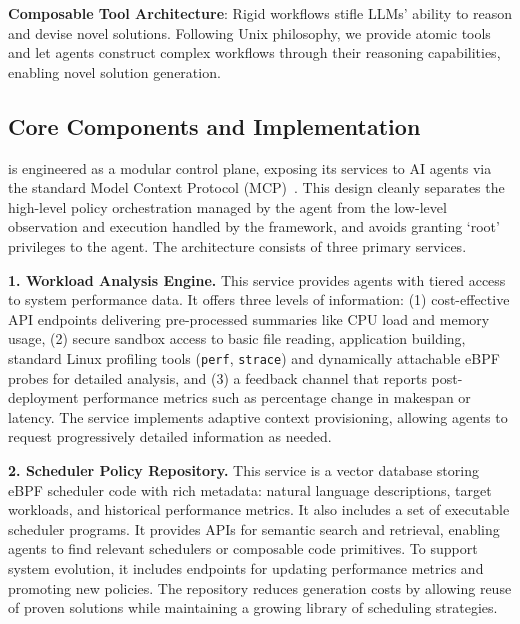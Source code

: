 \textbf{Composable Tool Architecture}: Rigid workflows stifle LLMs' ability to reason and devise novel solutions. Following Unix philosophy, we provide atomic tools and let agents construct complex workflows through their reasoning capabilities, enabling novel solution generation.

\subsection{Core Components and Implementation}
\sys is engineered as a modular control plane, exposing its services to AI agents via the standard Model Context Protocol (MCP)~\cite{anthropic2024mcp}. This design cleanly separates the high-level policy orchestration managed by the agent from the low-level observation and execution handled by the framework, and avoids granting `root' privileges to the agent. The architecture consists of three primary services.

\textbf{1. Workload Analysis Engine.} This service provides agents with tiered access to system performance data. It offers three levels of information: (1) cost-effective API endpoints delivering pre-processed summaries like CPU load and memory usage, (2) secure sandbox access to basic file reading, application building, standard Linux profiling tools (\texttt{perf}, \texttt{strace}) and dynamically attachable eBPF probes for detailed analysis, and (3) a feedback channel that reports post-deployment performance metrics such as percentage change in makespan or latency. The service implements adaptive context provisioning, allowing agents to request progressively detailed information as needed.

\textbf{2. Scheduler Policy Repository.} This service is a vector database storing eBPF scheduler code with rich metadata: natural language descriptions, target workloads, and historical performance metrics. It also includes a set of executable scheduler programs. It provides APIs for semantic search and retrieval, enabling agents to find relevant schedulers or composable code primitives. To support system evolution, it includes endpoints for updating performance metrics and promoting new policies. The repository reduces generation costs by allowing reuse of proven solutions while maintaining a growing library of scheduling strategies.

